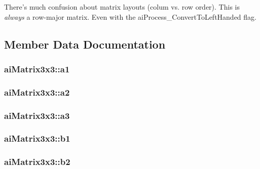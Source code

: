 There's much confusion about matrix layouts (colum vs. row order). This is {\itshape always} a row-\/major matrix. Even with the ai\-Process\-\_\-\-Convert\-To\-Left\-Handed flag. 

\subsection{Member Data Documentation}
\hypertarget{structai_matrix3x3_a6884258a2f50758ed8b554b531186917}{
\subsubsection[{a1}]{ ai\-Matrix3x3\-::a1}}\label{structai_matrix3x3_a6884258a2f50758ed8b554b531186917}
\hypertarget{structai_matrix3x3_a4c74733870193040ba4953fb673e77df}{
\subsubsection[{a2}]{ ai\-Matrix3x3\-::a2}}\label{structai_matrix3x3_a4c74733870193040ba4953fb673e77df}
\hypertarget{structai_matrix3x3_a851d391df32a39e1ced1a9a286b38cf4}{
\subsubsection[{a3}]{ ai\-Matrix3x3\-::a3}}\label{structai_matrix3x3_a851d391df32a39e1ced1a9a286b38cf4}
\hypertarget{structai_matrix3x3_a9eeba340d3502017caad70416f03863a}{
\subsubsection[{b1}]{ ai\-Matrix3x3\-::b1}}\label{structai_matrix3x3_a9eeba340d3502017caad70416f03863a}
\hypertarget{structai_matrix3x3_a9f5e25b60bbd7bdf8f0a19cd82cc6b15}{
\subsubsection[{b2}]{ ai\-Matrix3x3\-::b2}}\label{structai_matrix3x3_a9f5e25b60bbd7bdf8f0a19cd82cc6b15}
